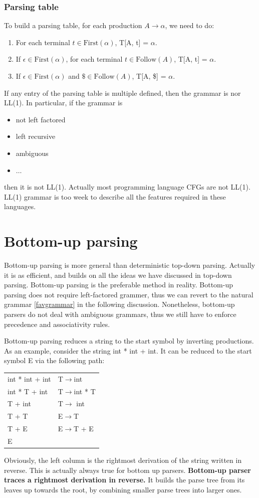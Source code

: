 \subsubsection{Parsing table}
To build a parsing table, for each production $A\rightarrow \alpha$, we need to do:
\begin{enumerate}
\item For each terminal $t\in\text{First}(\alpha)$, T[A, t] = $\alpha$.
\item If $\epsilon\in\text{First}(\alpha)$, for each terminal $t\in\text{Follow}(A)$, T[A, t] = $\alpha$.
\item If $\epsilon\in\text{First}(\alpha)$ and $\$\in\text{Follow}(A)$, T[A, \$] = $\alpha$.
\end{enumerate}

If any entry of the parsing table is multiple defined, then the grammar is nor LL(1). In particular, if the grammar is 
\begin{itemize}
\item not left factored
\item left recursive
\item ambiguous
\item $\dots$
\end{itemize}
then it is not LL(1). Actually most programming language CFGs are not LL(1). LL(1) grammar is too week to describe all the features required in these languages. 
\section{Bottom-up parsing}
Bottom-up parsing is more general than deterministic top-down parsing. Actually it is as efficient, and builds on all the ideas we have discussed in top-down parsing. Bottom-up parsing is the preferable method in reality. Bottom-up parsing does not require left-factored grammer, thus we can revert to the natural grammar \eqref{favgrammar} in the following discussion. Nonetheless, bottom-up parsers do not deal with ambiguous grammars, thus we still have to enforce precedence and associativity rules.

Bottom-up parsing reduces a string to the start symbol by inverting productions. As an example, consider the string int * int + int. It can be reduced to the start symbol E via the following path:
\begin{table}[H]
\centering
\begin{tabular}{ll}
int * int + int & T$\rightarrow$int\\
int * T + int & T$\rightarrow$int * T\\
T + int & T$\rightarrow$ int\\
T + T & E$\rightarrow$T\\
T + E & E$\rightarrow$T + E\\
E&\\
\end{tabular}
\end{table}
Obviously, the left column is the rightmost derivation of the string written in reverse. This is actually always true for bottom up parsers. {\bf Bottom-up parser traces a rightmost derivation in reverse.} It builds the parse tree from its leaves up towards the root, by combining smaller parse trees into larger ones.
